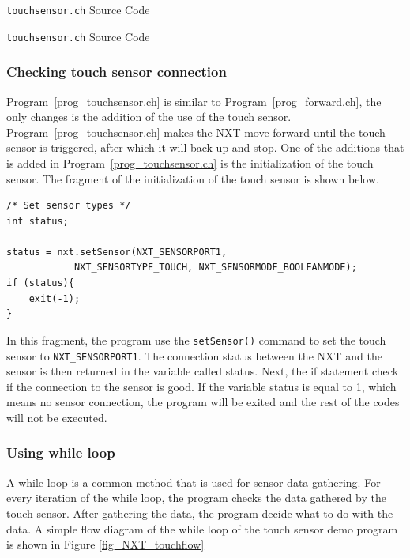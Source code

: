 \documentclass[11pt]{article}
\begin{document}
\begin{Program}[H]
    {\small}
    \caption{\texttt{touchsensor.ch} Source Code\label{prog_touchsensor.ch}}
\end{Program}
\addtocounter{Program}{-1}
\begin{Program}[H]
    {\small}
    \caption{\texttt{touchsensor.ch} Source Code\label{prog_touchsensor.ch}}
\end{Program}
\subsubsection*{Checking touch sensor connection}
Program~\ref{prog_touchsensor.ch} is similar to Program~\ref{prog_forward.ch}, the only changes is 
the addition of the use of the touch sensor. Program~\ref{prog_touchsensor.ch} makes the NXT move 
forward until the touch sensor is triggered, after which it will back up and stop. One of the additions that 
is added in Program~\ref{prog_touchsensor.ch} is the initialization of the touch sensor. The fragment of 
the initialization of the touch sensor is shown below.
\begin{verbatim}
/* Set sensor types */
int status;

status = nxt.setSensor(NXT_SENSORPORT1, 
            NXT_SENSORTYPE_TOUCH, NXT_SENSORMODE_BOOLEANMODE);
if (status){
    exit(-1);
}
\end{verbatim}
In this fragment, the program use the \verb+setSensor()+ command to set the touch sensor to \verb+NXT_SENSORPORT1+. 
The connection status between the NXT and the sensor is then returned in the variable called status. Next, the 
if statement check if the connection to the sensor is good. If the variable status is equal to 1, which means
no sensor connection, the program will be exited and the rest of the codes will not be executed.
 
\subsubsection*{Using while loop}
A while loop is a common method that is used for sensor data gathering. For every iteration of the while loop, 
the program checks the data gathered by the touch sensor. After gathering the data, the program decide what to 
do with the data. A simple flow diagram of the while loop of the touch sensor demo program is shown in Figure 
\ref{fig_NXT_touchflow}\\
\end{document}
